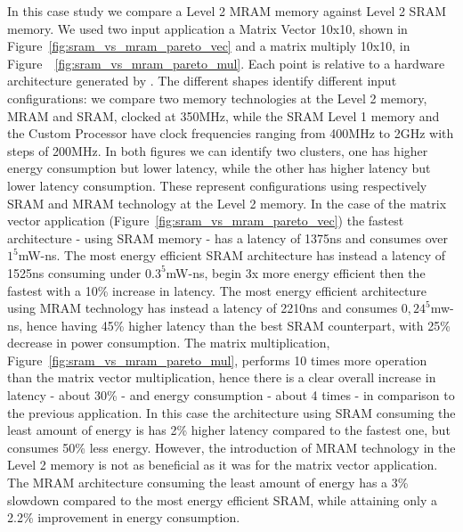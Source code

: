 In this case study we compare a Level 2 MRAM memory against Level 2 SRAM memory. We used two input application a Matrix Vector 10x10, shown in Figure~\ref{fig:sram_vs_mram_pareto_vec} and a matrix multiply 10x10, in Figure~~\ref{fig:sram_vs_mram_pareto_mul}. Each point is relative to a hardware architecture generated by \frameworkname. The different shapes identify different input configurations: we compare two memory technologies at the Level 2 memory, MRAM and SRAM, clocked at 350MHz, while the SRAM Level 1 memory and the Custom Processor have clock frequencies ranging from 400MHz to 2GHz with steps of 200MHz. In both figures we can identify two clusters, one has higher energy consumption but lower latency, while the other has higher latency but lower latency consumption. These represent  configurations using respectively SRAM and MRAM technology at the Level 2 memory. In the case of the matrix vector application (Figure~\ref{fig:sram_vs_mram_pareto_vec}) the fastest architecture - using SRAM memory - has a latency of 1375ns and consumes over $1^5$mW-ns. The most energy efficient SRAM architecture has instead a latency of 1525ns consuming under $0.3^5$mW-ns, begin 3x more energy efficient then the fastest with a 10\% increase in latency. The most energy efficient architecture using MRAM technology has instead a latency of 2210ns and consumes $0,24^5$mw-ns, hence having 45\% higher latency than the best SRAM counterpart, with 25\% decrease in power consumption. The matrix multiplication, Figure~\ref{fig:sram_vs_mram_pareto_mul}, performs 10 times more operation than the matrix vector multiplication, hence there is a clear overall increase in latency - about 30\% - and energy consumption - about 4 times -  in comparison to the previous application. In this case the architecture using SRAM consuming the least amount of energy is has 2\% higher latency compared to the fastest one, but consumes 50\% less energy. However, the introduction of MRAM technology in the Level 2 memory is not as beneficial as it was for the matrix vector application. The MRAM architecture consuming the least amount of energy has a 3\% slowdown compared to the most energy efficient SRAM, while attaining only a 2.2\% improvement in energy consumption. 



